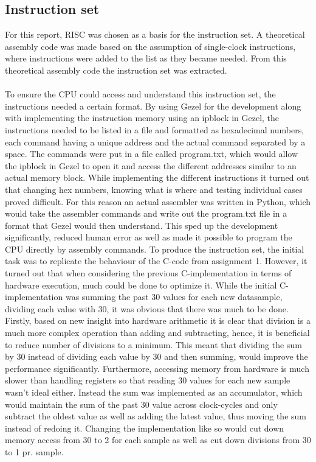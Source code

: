 \documentclass[12pt,a4paper]{article}
\begin{document}
\subsection{Instruction set}
	For this report, RISC was chosen as a basis for the instruction set. A theoretical assembly code was made based on the assumption of single-clock instructions, where instructions were added to the list as they became needed. From this theoretical assembly code the instruction set was extracted.\\
	\\
	To ensure the CPU could access and understand this instruction set, the instructions needed a certain format. By using Gezel for the development along with implementing the instruction memory using an ipblock in Gezel, the instructions needed to be listed in a file and formatted as hexadecimal numbers, each command having a unique address and the actual command separated by a space. The commands were put in a file called program.txt, which would allow the ipblock in Gezel to open it and access the different addresses similar to an actual memory block.
	While implementing the different instructions it turned out that changing hex numbers, knowing what is where and testing individual cases proved difficult. For this reason an actual assembler was written in Python, which would take the assembler commands and write out the program.txt file in a format that Gezel would then understand. This sped up the development significantly, reduced human error as well as made it possible to program the CPU directly by assembly commands.
	To produce the instruction set, the initial task was to replicate the behaviour of the C-code from assignment 1. However, it turned out that when considering the previous C-implementation in terms of hardware execution, much could be done to optimize it. While the initial C-implementation was summing the past 30 values for each new datasample, dividing each value with 30, it was obvious that there was much to be done.
	Firstly, based on new insight into hardware arithmetic it is clear that division is a much more complex operation than adding and subtracting, hence, it is beneficial to reduce number of divisions to a minimum. This meant that dividing the sum by 30 instead of dividing each value by 30 and then summing, would improve the performance significantly. Furthermore, accessing memory from hardware is much slower than handling registers so that reading 30 values for each new sample wasn't ideal either. Instead the sum was implemented as an accumulator, which would maintain the sum of the past 30 value across clock-cycles and only subtract the oldest value as well as adding the latest value, thus moving the sum instead of redoing it. Changing the implementation like so would cut down memory access from 30 to 2 for each sample as well as cut down divisions from 30 to 1 pr. sample. 
\end{document}
